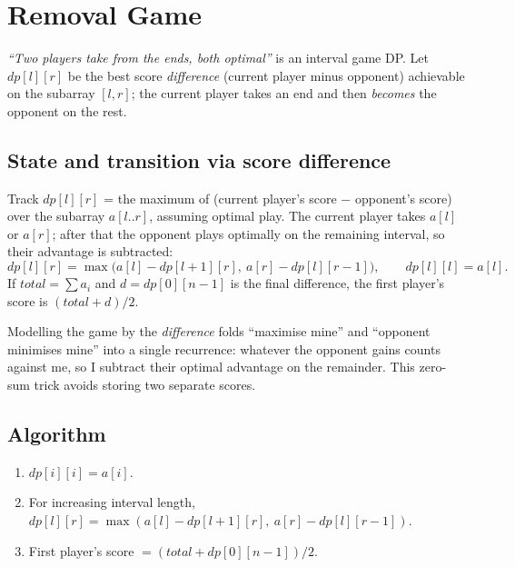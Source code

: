 \section{Removal Game}
\label{sec:cses-removal-game}


\begin{patternbox}
\emph{``Two players take from the ends, both optimal''} is an interval
game DP. Let $\textit{dp}[l][r]$ be the best score \emph{difference} (current
player minus opponent) achievable on the subarray $[l,r]$; the current
player takes an end and then \emph{becomes} the opponent on the rest.
\end{patternbox}

\subsection*{State and transition via score difference}

Track $\textit{dp}[l][r]$ = the maximum of (current player's score $-$
opponent's score) over the subarray $a[l..r]$, assuming optimal play. The
current player takes $a[l]$ or $a[r]$; after that the opponent plays
optimally on the remaining interval, so their advantage is subtracted:
\[
  \textit{dp}[l][r]=\max\!\big(a[l]-\textit{dp}[l+1][r],\
  a[r]-\textit{dp}[l][r-1]\big),\qquad \textit{dp}[l][l]=a[l].
\]
If $\textit{total}=\sum a_i$ and $d=\textit{dp}[0][n-1]$ is the final
difference, the first player's score is $(\textit{total}+d)/2$.

\begin{ideabox}
Modelling the game by the \emph{difference} folds ``maximise mine'' and
``opponent minimises mine'' into a single recurrence: whatever the
opponent gains counts against me, so I subtract their optimal advantage on
the remainder. This zero-sum trick avoids storing two separate scores.
\end{ideabox}

\subsection*{Algorithm}

\begin{enumerate}
  \item $\textit{dp}[i][i]=a[i]$.
  \item For increasing interval length, $\textit{dp}[l][r]=\max(a[l]-
        \textit{dp}[l+1][r],\ a[r]-\textit{dp}[l][r-1])$.
  \item First player's score $=(\textit{total}+\textit{dp}[0][n-1])/2$.
\end{enumerate}

